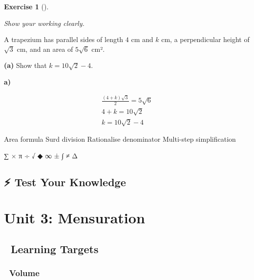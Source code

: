 \documentclass[
  letterpaper,
  DIV=11,
  numbers=noendperiod]{scrreprt}
\theoremstyle{definition}
\newtheorem{exercise}{Exercise}[chapter]
\theoremstyle{remark}
\begin{document}
\begin{exercise}[]\protect\hypertarget{exr-u2-59}{}\label{exr-u2-59}

\emph{Show your working clearly.}

A trapezium has parallel sides of length \(4\) cm and \(k\) cm, a
perpendicular height of \(\sqrt{3}\) cm, and an area of \(5\sqrt{6}\)
cm².

\textbf{(a)} Show that \(k = 10\sqrt{2}-4\).

\begin{tcolorbox}[enhanced jigsaw, opacitybacktitle=0.6, coltitle=black, arc=.35mm, colframe=quarto-callout-tip-color-frame, colback=white, bottomrule=.15mm, left=2mm, colbacktitle=quarto-callout-tip-color!10!white, titlerule=0mm, opacityback=0, title=\textcolor{quarto-callout-tip-color}{\faLightbulb}\hspace{0.5em}{🔍 View Solution}, leftrule=.75mm, breakable, rightrule=.15mm, bottomtitle=1mm, toptitle=1mm, toprule=.15mm]

\textbf{a)}

\[
\begin{aligned}
\frac{(4+k)\sqrt{3}}{2}=5\sqrt{6} \\ 4+k=10\sqrt{2} \\ k=10\sqrt{2}-4
\end{aligned}
\]

\end{tcolorbox}

{Area formula} {Surd division} {Rationalise denominator} {Multi-step
simplification}

\end{exercise}

∑ × π ÷ √ ◆ ∞ ± ∫ ≠ Δ

\section{⚡ Test Your Knowledge}\label{sec-indices-worksheet}

\chapter{Unit 3: Mensuration}\label{unit-3-mensuration}

\section{🎯 Learning Targets}\label{learning-targets-2}

\subsection*{🔵 Volume}\label{volume}
\end{document}
